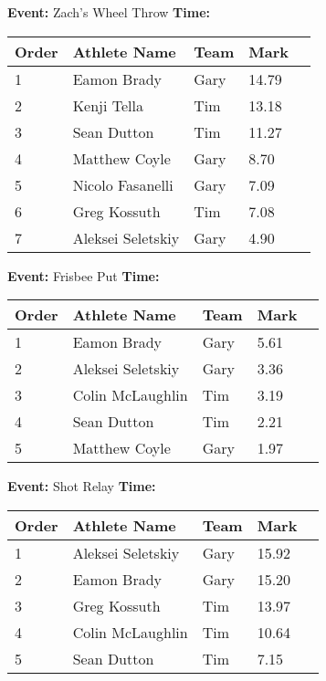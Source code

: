 \documentclass[10pt]{article}
\begin{document}
\textbf{Event:} Zach's Wheel Throw \quad \textbf{Time:}  

\vspace{1em}
\begin{tabular}{@{}lllll@{}}
\toprule

\textbf{Order} & \textbf{Athlete Name} & \textbf{Team} & \textbf{Mark} \\
\midrule
1 & Eamon Brady & Gary & 14.79 &\\
2 & Kenji Tella & Tim & 13.18 &\\
3 & Sean Dutton & Tim & 11.27 &\\
4 & Matthew Coyle & Gary & 8.70 &\\
5 & Nicolo Fasanelli & Gary & 7.09 &\\
6 & Greg Kossuth & Tim & 7.08 &\\
7 & Aleksei Seletskiy & Gary & 4.90 &\\
\bottomrule
\end{tabular}
\vspace{2.5em}


\textbf{Event:} Frisbee Put \quad \textbf{Time:}  

\vspace{1em}
\begin{tabular}{@{}lllll@{}}
\toprule

\textbf{Order} & \textbf{Athlete Name} & \textbf{Team} & \textbf{Mark} \\
\midrule
1 & Eamon Brady & Gary & 5.61 &\\
2 & Aleksei Seletskiy & Gary & 3.36 &\\
3 & Colin McLaughlin & Tim & 3.19 &\\
4 & Sean Dutton & Tim & 2.21 &\\
5 & Matthew Coyle & Gary & 1.97 &\\
\bottomrule
\end{tabular}
\vspace{2.5em}


\textbf{Event:} Shot Relay \quad \textbf{Time:}  

\vspace{1em}
\begin{tabular}{@{}lllll@{}}
\toprule

\textbf{Order} & \textbf{Athlete Name} & \textbf{Team} & \textbf{Mark} \\
\midrule
1 & Aleksei Seletskiy & Gary & 15.92 &\\
2 & Eamon Brady & Gary & 15.20 &\\
3 & Greg Kossuth & Tim & 13.97 &\\
4 & Colin McLaughlin & Tim & 10.64 &\\
5 & Sean Dutton & Tim & 7.15 &\\
\bottomrule
\end{tabular}
\vspace{2.5em}
\end{document}
